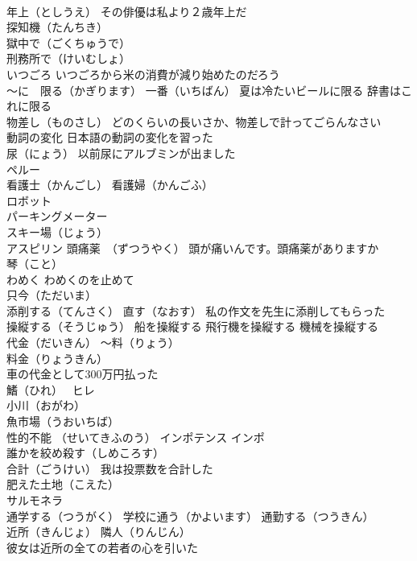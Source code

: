 \documentclass[8pt]{extreport}
\begin{document}
\begin{CJK}{UTF8}{min}
\\	年上（としうえ） その俳優は私より２歳年上だ
\\	探知機（たんちき）
\\	獄中で（ごくちゅうで） 
\\	刑務所で（けいむしょ）
\\	いつごろ いつごろから米の消費が減り始めたのだろう
\\	～に　限る（かぎります） 一番（いちばん） 夏は冷たいビールに限る 辞書はこれに限る
\\	物差し（ものさし） どのくらいの長いさか、物差しで計ってごらんなさい
\\	動詞の変化 日本語の動詞の変化を習った
\\	尿（にょう） 以前尿にアルブミンが出ました
\\	ペルー
\\	看護士（かんごし） 看護婦（かんごふ）
\\	ロボット
\\	パーキングメーター
\\	スキー場（じょう）
\\	アスピリン 頭痛薬　（ずつうやく） 頭が痛いんです。頭痛薬がありますか
\\	琴（こと）
\\	わめく わめくのを止めて
\\	只今（ただいま）
\\	添削する（てんさく） 直す（なおす） 私の作文を先生に添削してもらった
\\	操縦する（そうじゅう） 船を操縦する 飛行機を操縦する 機械を操縦する
\\	代金（だいきん） ～料（りょう）
\\	料金（りょうきん）
\\	車の代金として300万円払った
\\	鰭（ひれ）　 ヒレ
\\	小川（おがわ）
\\	魚市場（うおいちば）
\\	性的不能 （せいてきふのう） インポテンス インポ 
\\	誰かを絞め殺す（しめころす）
\\	合計（ごうけい） 我は投票数を合計した
\\	肥えた土地（こえた）
\\	サルモネラ
\\	通学する（つうがく） 学校に通う（かよいます） 通勤する（つうきん）
\\	近所（きんじょ） 隣人（りんじん） 
\\	彼女は近所の全ての若者の心を引いた

\end{CJK}
\end{document}
